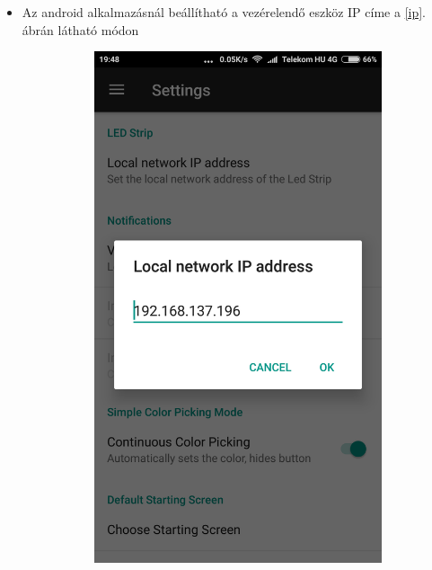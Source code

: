 \documentclass[12pt]{extarticle}
\begin{document}
	\begin{itemize}
		\item 	Az android alkalmazásnál beállítható a vezérelendő eszköz IP címe a \ref{ip}. ábrán látható módon 
		
		\begin{figure}[h!]
			\centering
			\begin{subfigure}[b]{0.4\linewidth}
				\includegraphics[width=\linewidth]{ip.png}
				\caption{}
			\end{subfigure}

\end{figure}
\end{itemize}
\end{document}
